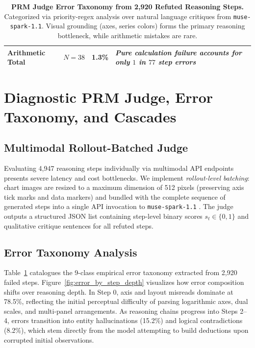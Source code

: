 \documentclass[11pt]{article}
\begin{document}
\begin{table}[t]
\begin{tabular}{lcr p{3.2cm} p{5.2cm}}
\textbf{Arithmetic Total} & $N=38$ & \textbf{1.3\%} & \multicolumn{2}{l}{\textit{Pure calculation failure accounts for only $1$ in $77$ step errors}} \\
\bottomrule
\end{tabular}
\caption{\textbf{PRM Judge Error Taxonomy from 2,920 Refuted Reasoning Steps.} Categorized via priority-regex analysis over natural language critiques from \texttt{muse-spark-1.1}. Visual grounding (axes, series colors) forms the primary reasoning bottleneck, while arithmetic mistakes are rare.}
\label{tab:appendix_error_taxonomy}
\end{table}


\section{Diagnostic PRM Judge, Error Taxonomy, and Cascades}
\label{sec:appendix_diagnostics}

\subsection{Multimodal Rollout-Batched Judge}
\label{subsec:appendix_judge_details}

Evaluating 4,947 reasoning steps individually via multimodal API endpoints presents severe latency and cost bottlenecks. We implement \textit{rollout-level batching}: chart images are resized to a maximum dimension of 512 pixels (preserving axis tick marks and data markers) and bundled with the complete sequence of generated steps into a single API invocation to \texttt{muse-spark-1.1} \citep{meta2026musespark, zheng2023judging}. The judge outputs a structured JSON list containing step-level binary scores $s_t \in \{0, 1\}$ and qualitative critique sentences for all refuted steps.

\subsection{Error Taxonomy Analysis}
\label{subsec:appendix_taxonomy_analysis}

Table~\ref{tab:appendix_error_taxonomy} catalogues the 9-class empirical error taxonomy extracted from 2,920 failed steps. Figure~\ref{fig:error_by_step_depth} visualizes how error composition shifts over reasoning depth. In Step 0, axis and layout misreads dominate at 78.5\%, reflecting the initial perceptual difficulty of parsing logarithmic axes, dual scales, and multi-panel arrangements. As reasoning chains progress into Steps 2--4, errors transition into entity hallucinations (15.2\%) and logical contradictions (8.2\%), which stem directly from the model attempting to build deductions upon corrupted initial observations.
\end{document}
